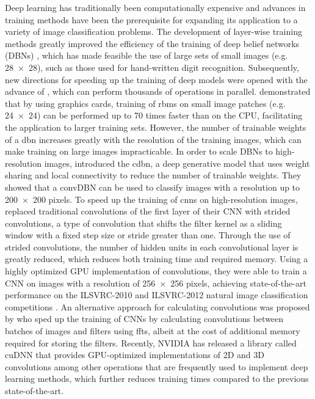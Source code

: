 Deep learning \citep{lecun2015} has traditionally been computationally expensive
and advances in training methods have been the prerequisite for expanding its
application to a variety of image classification problems. The development of
layer-wise training methods \citep{hinton2006b} greatly improved the efficiency
of the training of deep belief networks (DBNs) \citep{hinton2006b}, which has
made feasible the use of large sets of small images (e.g. \num{28x28}), such as
those used for hand-written digit recognition. Subsequently, new directions for
speeding up the training of deep models were opened with the advance of
, which can perform thousands
of operations in parallel.
\citet{raina2009} demonstrated that by using graphics cards, training of
\glspl{rbm} \citep{freund1992,hinton2010a} on small image patches (e.g.
\num{24x24}) can be performed up to \num{70} times faster than on the CPU,
facilitating the application to larger training sets. However, the number of
trainable weights of a \gls{dbn} increases greatly with the resolution of the
training images, which can make training on large images impracticable. In order
to scale DBNs to high-resolution images, \citet{lee2009,lee2011} introduced the
\gls{cdbn}, a deep generative model that uses weight sharing and local
connectivity to reduce the number of trainable weights. They showed that a
convDBN can be used to classify images with a resolution up to \num{200x200}
pixels. To speed up the training of \glspl{cnn}
\citep{fukushima1980,lecun1989,lecun1998} on high-resolution images,
\citet{krizhevsky2012} replaced traditional convolutions of the first layer of
their CNN with strided convolutions, a type of convolution that shifts the
filter kernel as a sliding window with a fixed step size or stride greater than
one. Through the use of strided convolutions, the number of hidden units in each
convolutional layer is greatly reduced, which reduces both training time and
required memory. Using a highly optimized GPU implementation of convolutions,
they were able to train a CNN on images with a resolution of \num{256x256}
pixels, achieving state-of-the-art performance on the ILSVRC-2010 and
ILSVRC-2012 natural image classification competitions \citep{krizhevsky2012}. An
alternative approach for calculating convolutions was proposed by
\citet{mathieu2013} who sped up the training of CNNs by calculating convolutions
between batches of images and filters using \glspl{fft}, albeit at the cost of
additional memory required for storing the filters. Recently, NVIDIA has
released a library called cuDNN \citep{chetlur2014} that provides GPU-optimized
implementations of 2D and 3D convolutions among other operations that are
frequently used to implement deep learning methods, which further reduces
training times compared to the previous state-of-the-art.

